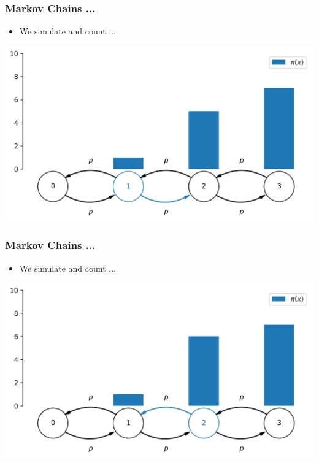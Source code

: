 \begin{frame}[c]
    \frametitle{Markov Chains ...}
    \begin{itemize}
        \item We simulate and count ...
    \end{itemize}
    \begin{center}
        \includegraphics[scale=0.6]{imgs/simulation12.png}
    \end{center}
\end{frame}

\begin{frame}[c]
    \frametitle{Markov Chains ...}
    \begin{itemize}
        \item We simulate and count ...
    \end{itemize}
    \begin{center}
        \includegraphics[scale=0.6]{imgs/simulation13.png}
    \end{center}
\end{frame}

